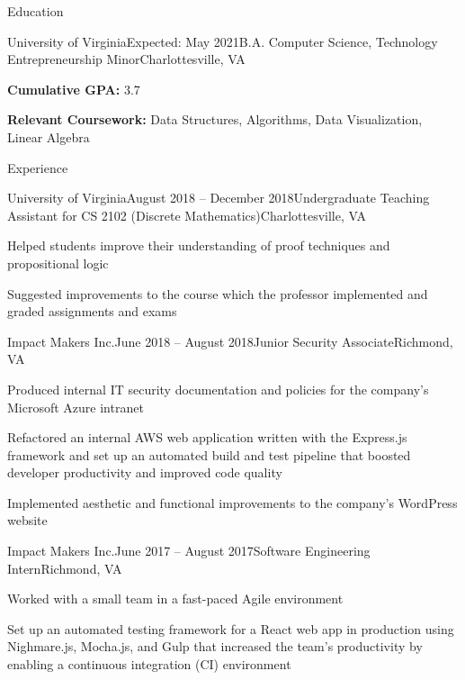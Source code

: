 \documentclass{resume}
\begin{document}
\begin{rSection}{Education}

  \begin{rSubsection}{University of Virginia}{Expected: May 2021}{B.A. Computer Science, Technology Entrepreneurship Minor}{Charlottesville, VA}
    \item \textbf{Cumulative GPA:} 3.7
    \item \textbf{Relevant Coursework:} Data Structures, Algorithms, Data Visualization, Linear Algebra
  \end{rSubsection}

\end{rSection}

\begin{rSection}{Experience}

  \begin{rSubsection}{University of Virginia}{August 2018 -- December 2018}{Undergraduate Teaching Assistant for CS 2102 (Discrete Mathematics)}{Charlottesville, VA}
    \item Helped students improve their understanding of proof techniques and propositional logic
    \item Suggested improvements to the course which the professor implemented and graded assignments and exams
  \end{rSubsection}

  \begin{rSubsection}{Impact Makers Inc.}{June 2018 -- August 2018}{Junior Security Associate}{Richmond, VA}
    \item Produced internal IT security documentation and policies for the company's Microsoft Azure intranet
    \item Refactored an internal AWS web application written with the Express.js framework and set up an automated build and test pipeline that boosted developer productivity and improved code quality
    \item Implemented aesthetic and functional improvements to the company's WordPress website
  \end{rSubsection}

  \begin{rSubsection}{Impact Makers Inc.}{June 2017 -- August 2017}{Software Engineering Intern}{Richmond, VA}
    \item Worked with a small team in a fast-paced Agile environment
    \item Set up an automated testing framework for a React web app in production using Nighmare.js, Mocha.js, and Gulp that increased the team's productivity by enabling a continuous integration (CI) environment
  \end{rSubsection}

\end{rSection}
\end{document}
